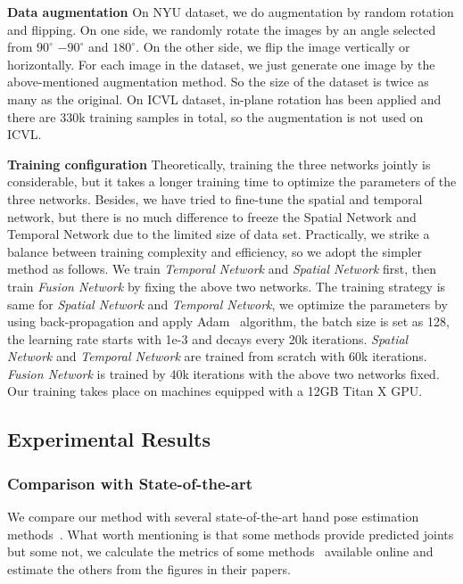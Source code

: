 \documentclass[journal,comsoc]{IEEEtran}
\begin{document}
\textbf{Data augmentation}
On NYU dataset, we do augmentation by random rotation and flipping. On one side, we randomly rotate the images
by an angle selected from $90^\circ$ $-90^{\circ}$ and $180^{\circ}$. On the other side, we flip the image
vertically or horizontally. For each image in the dataset, we just generate one image by the above-mentioned augmentation
method. So the size of the dataset is twice as many as the original. On ICVL dataset, in-plane rotation has been applied and
there are 330k training samples in total, so the augmentation is not used on ICVL.

\textbf{Training configuration}
Theoretically, training the three networks jointly is considerable, but it takes a longer training time to
optimize the parameters of the three networks. Besides, we have tried to fine-tune the spatial and temporal network,
but there is no much difference to freeze the Spatial Network and Temporal Network due to the limited size of
data set. Practically, we strike a balance between training complexity and efficiency, so we adopt the simpler method as follows. We train
\emph{Temporal Network} and \emph{Spatial Network} first, then train \emph{Fusion Network} by fixing the above two networks.
The training strategy is same for \emph{Spatial Network} and \emph{Temporal Network}, we optimize the parameters by using back-propagation
and apply Adam~\cite{kingma2015adam} algorithm, the batch size is set as 128, the learning rate starts with 1e-3 and decays every 20k iterations.
\emph{Spatial Network} and \emph{Temporal Network} are trained from scratch with 60k iterations.
\emph{Fusion Network} is trained by 40k iterations with the above two networks fixed.
Our training takes place on machines equipped with a 12GB Titan X GPU.

\subsection{Experimental Results}\label{sec:experimental results}
\subsubsection{Comparison with State-of-the-art}\label{sec:comparison}
We compare our method with several state-of-the-art hand pose estimation methods~\cite{tompson2014real,Wan_2017_CVPR,
oberweger2015hands,oberweger2015training,zhou2016model,tang2014latent,Ge_2017_CVPR,sinha2016deephand}. What worth mentioning is
that some methods provide predicted joints but some not, we calculate the metrics of some methods~\cite{tompson2014real,
oberweger2015hands,oberweger2015training,zhou2016model,tang2014latent} available online and estimate the others from the
figures in their papers.
\end{document}
